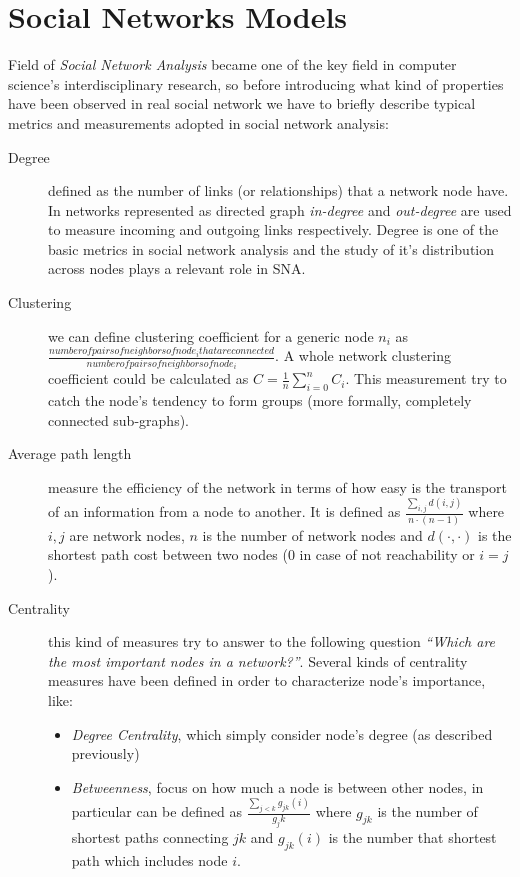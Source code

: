 \section{Social Networks Models}
\label{social_networks}

Field of \textit{Social Network Analysis} became one of the key field in computer science's interdisciplinary research, so before introducing what kind of properties have been observed in real social network we have to briefly describe typical metrics and measurements adopted in social network analysis:
\begin{description}
\item [Degree] defined as the number of links (or relationships) that a network node have\cite[7.1]{newman:2010}. In networks represented as directed graph \emph{in-degree} and \emph{out-degree} are used to measure incoming and outgoing links respectively. Degree is one of the basic metrics in social network analysis and the study of it's distribution across nodes plays a relevant role in SNA.
\item [Clustering] we can define clustering coefficient for a generic node $n_{i}$ as $\frac{number of pairs of neighbors of node_{i} that are connected}{number of pairs of neighbors of node_{i}}$. A whole network clustering coefficient could be calculated as $C=\frac{1}{n} \sum_{i=0}^{n} C_{i}$\cite[Figure 2 caption]{citeulike:1580006}. This measurement try to catch the node's tendency to form groups (more formally, completely connected sub-graphs).
\item [Average path length] measure the efficiency of the network in terms of how easy is the transport of an information from a node to another. It is defined as $\frac{\sum_{i,j}{d(i,j)}}{n\cdot (n-1)}$ where $i,j$ are network nodes, $n$ is the number of network nodes and $d(\cdot,\cdot)$ is the shortest path cost between two nodes ($0$ in case of not reachability or $i=j$). 
\item [Centrality] this kind of measures try to answer to the following question \textit{``Which are the most important nodes in a network?''}. Several kinds of centrality measures have been defined in order to characterize node's importance, like:
\begin{itemize}

\item \emph{Degree Centrality}, which simply consider node's degree (as described previously)

\item \emph{Betweenness}, focus on how much a node is between other nodes, in particular can be defined as $ \frac{\sum_{j<k}{g_{jk}(i)}}{g_jk }$ where $g_{jk}$ is the number of shortest paths connecting $jk$ and $g_{jk}(i)$ is the number that shortest path which includes node $i$.


\end{itemize}
\end{description}
